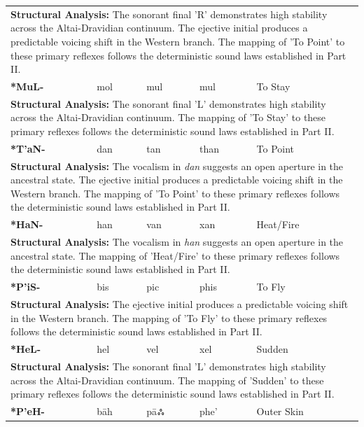\begin{longtable}{p{} p{} p{} p{} p{}}
\multicolumn{5}{p{\textwidth}}{\small \textbf{Structural Analysis:} The sonorant final 'R' demonstrates high stability across the Altai-Dravidian continuum. The ejective initial produces a predictable voicing shift in the Western branch. The mapping of 'To Point' to these primary reflexes follows the deterministic sound laws established in Part II.} \\ \addlinespace[15pt] 
\textbf{*MuL-} & mol & mul & mul & To Stay \\ 
\multicolumn{5}{p{\textwidth}}{\small \textbf{Structural Analysis:} The sonorant final 'L' demonstrates high stability across the Altai-Dravidian continuum. The mapping of 'To Stay' to these primary reflexes follows the deterministic sound laws established in Part II.} \\ \addlinespace[15pt] 
\textbf{*T'aN-} & dan & tan & than & To Point \\ 
\multicolumn{5}{p{\textwidth}}{\small \textbf{Structural Analysis:} The vocalism in \textit{dan} suggests an open aperture in the ancestral state. The ejective initial produces a predictable voicing shift in the Western branch. The mapping of 'To Point' to these primary reflexes follows the deterministic sound laws established in Part II.} \\ \addlinespace[15pt] 
\textbf{*HaN-} & han & van & xan & Heat/Fire \\ 
\multicolumn{5}{p{\textwidth}}{\small \textbf{Structural Analysis:} The vocalism in \textit{han} suggests an open aperture in the ancestral state. The mapping of 'Heat/Fire' to these primary reflexes follows the deterministic sound laws established in Part II.} \\ \addlinespace[15pt] 
\textbf{*P'iS-} & bis & pic & phis & To Fly \\ 
\multicolumn{5}{p{\textwidth}}{\small \textbf{Structural Analysis:} The ejective initial produces a predictable voicing shift in the Western branch. The mapping of 'To Fly' to these primary reflexes follows the deterministic sound laws established in Part II.} \\ \addlinespace[15pt] 
\textbf{*HeL-} & hel & vel & xel & Sudden \\ 
\multicolumn{5}{p{\textwidth}}{\small \textbf{Structural Analysis:} The sonorant final 'L' demonstrates high stability across the Altai-Dravidian continuum. The mapping of 'Sudden' to these primary reflexes follows the deterministic sound laws established in Part II.} \\ \addlinespace[15pt] 
\textbf{*P'eH-} & bāh & pāஃ & phe' & Outer Skin \\ 

\end{longtable}

